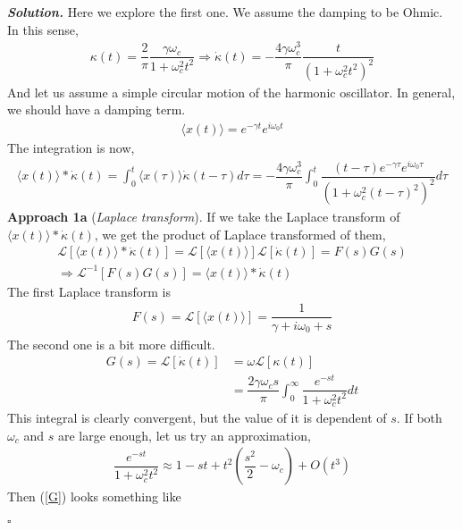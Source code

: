 \documentclass[12pt]{article}
\newenvironment{solution}[1][\it{Solution}]{\textbf{#1. } }{$\square$}
\begin{document}
\begin{solution}
Here we explore the first one. We assume the damping to be Ohmic. In this sense,
\begin{align}
    \kappa(t) = \dfrac{2}{\pi}\dfrac{\gamma \omega_c}{1+\omega_c^2t^2}\Rightarrow \dot{\kappa}(t) = -\dfrac{4\gamma\omega_c^3}{\pi}\dfrac{t}{(1+\omega_c^2t^2)^2}
\end{align}
And let us assume a simple circular motion of the harmonic oscillator. In general, we should have a damping term.
\begin{align}
    \langle x(t)\rangle = e^{-\gamma t}e^{i\omega_0 t}
\end{align}
The integration is now,
\begin{align}
    \langle x(t)\rangle * \dot{\kappa}(t)= \int_0^t \langle x(\tau)\rangle \dot{\kappa}(t-\tau) d\tau =
    -\dfrac{4\gamma\omega_c^3}{\pi}\int_0^t \dfrac{(t-\tau)e^{-\gamma \tau}e^{i\omega_0 \tau}}{(1+\omega_c^2(t-\tau)^2)^2} d\tau
\end{align}
\textbf{Approach 1a} (\textit{Laplace transform}). If we take the Laplace transform of $\langle x(t)\rangle * \dot{\kappa}(t)$, we get the product of Laplace transformed of them,
\begin{align}
    \mathcal{L}\left[\langle x(t)\rangle * \dot{\kappa}(t)\right] = \mathcal{L}\left[\langle x(t)\rangle\right]\mathcal{L}\left[\dot{\kappa}(t)\right]=F(s)G(s)\label{prodL}\\
    \boxed{\Rightarrow \mathcal{L}^{-1}\left[F(s)G(s)\right] = \langle x(t)\rangle * \dot{\kappa}(t)}
\end{align}
The first Laplace transform is
\begin{align}
    F(s) = \mathcal{L}[\langle x(t)\rangle]=\dfrac{1}{\gamma + i\omega_0+s}
\end{align}
The second one is a bit more difficult.
\begin{align}
    G(s) = \mathcal{L}[\dot{\kappa}(t)]&= \omega \mathcal{L}[\kappa(t)]\\
    &= \dfrac{2\gamma\omega_c s}{\pi}\int_0^\infty \dfrac{e^{-s t}}{1+\omega_c^2t^2}dt\label{G}
\end{align}
This integral is clearly convergent, but the value of it is dependent of $s$. If both $\omega_c$ and $s$ are large enough, let us try an approximation,
\begin{align}
    \dfrac{e^{-s t}}{1+\omega_c^2t^2} \approx 1-s t+t^2\left(\dfrac{s^2}{2}-\omega_c\right)+O(t^3)
\end{align}
Then (\ref{G}) looks something like
\begin{align}

\end{align}
\end{solution}
\end{document}
